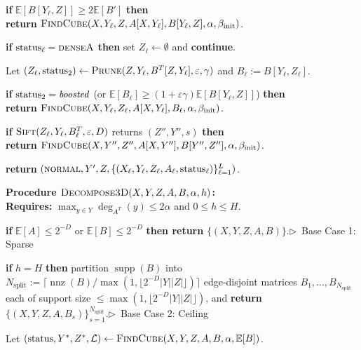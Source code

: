 \documentclass[11pt]{article}
\theoremstyle{definition}
\newcommand{\algcomment}[1]{\hfill $\triangleright$~{\small #1}}
\renewcommand{\label}[1]{}%
\newcommand{\E}{\mathbb{E}}
\newcommand{\supp}{\operatorname{supp}}
\newcommand{\nnz}{\operatorname{nnz}}
\newcommand{\abs}[1]{\left\lvert #1 \right\rvert}
\newcommand{\dens}[1]{\E[#1]}
\newcommand{\Prune}{\textnormal{\textsc{Prune}}}
\newcommand{\Sift}{\textnormal{\textsc{Sift}}}
\newcommand{\FindCube}{\textnormal{\textsc{FindCube}}}
\newcommand{\DecomposeThreeD}{\textnormal{\textsc{Decompose3D}}}
\newcommand{\tagdenseA}{\textnormal{\textsc{denseA}}}
\newcommand{\tagnormal}{\textnormal{\textsc{normal}}}
\begin{document}
\begin{algorithm}[!htbp]
\begin{algsteps}
    \item \quad \textbf{if} $\dens{B[Y_\ell, Z]} \ge 2\dens{B'}$ \textbf{then}\\
    \qquad \textbf{return} $\FindCube(X, Y_\ell, Z, A[X, Y_\ell], B[Y_\ell, Z], \alpha, \beta_{\text{init}})$.\label{line:cube-slice}
    \item \quad \textbf{if} $\text{status}_\ell = \tagdenseA$ \textbf{then} set $Z_\ell \gets \emptyset$ and \textbf{continue}.\label{line:cube-densea}
    \item \quad Let $(Z_\ell, \text{status}_2) \gets \Prune(Z, Y_\ell, B^T[Z, Y_\ell], \varepsilon, \gamma)$ and $B_\ell := B[Y_\ell, Z_\ell]$.\label{line:cube-prune2}
    \item \quad \textbf{if} $\text{status}_2 = \text{\emph{boosted}}$ (or $\dens{B_\ell} \ge (1 + \varepsilon\gamma)\dens{B[Y_\ell, Z]}$) \textbf{then}\\
    \qquad \textbf{return} $\FindCube(X, Y_\ell, Z_\ell, A[X, Y_\ell], B_\ell, \alpha, \beta_{\text{init}})$.\label{line:cube-rec2}
    \item \quad \textbf{if} $\Sift(Z_\ell, Y_\ell, B_\ell^T, \varepsilon, D)$ returns $(Z'', Y'', s)$ \textbf{then}\\
    \qquad \textbf{return} $\FindCube(X, Y'', Z'', A[X, Y''], B[Y'', Z''], \alpha, \beta_{\text{init}})$.\label{line:cube-sift}
    \item \textbf{return} $(\tagnormal, Y', Z, \{(X_\ell, Y_\ell, Z_\ell, A_\ell, \text{status}_\ell)\}_{\ell=1}^L)$.\label{line:cube-ret}
\end{algsteps}
\vspace{4pt}
\textbf{Procedure $\DecomposeThreeD(X, Y, Z, A, B, \alpha, h)$:}\\
\textbf{Requires:} $\max_{y \in Y}\deg_{A^T}(y) \le 2\alpha$ and $0 \le h \le H$.
\begin{algsteps}[resume]
    \item \textbf{if} $\dens{A} \le 2^{-D}$ or $\dens{B} \le 2^{-D}$ \textbf{then return} $\{(X, Y, Z, A, B)\}$.\algcomment{Base Case 1: Sparse}\label{line:3d-base1}
    \item \textbf{if} $h = H$ \textbf{then} partition $\supp(B)$ into $N_{\text{split}} := \lceil \nnz(B)/\max(1, \lfloor 2^{-D}\abs{Y}\abs{Z} \rfloor) \rceil$ edge-disjoint matrices $B_1, \dots, B_{N_{\text{split}}}$ each of support size $\le \max(1, \lfloor 2^{-D}\abs{Y}\abs{Z} \rfloor)$, and \textbf{return} $\{(X, Y, Z, A, B_s)\}_{s=1}^{N_{\text{split}}}$.\algcomment{Base Case 2: Ceiling}\label{line:3d-base2}
    \item Let $(\text{status}, Y^*, Z^*, \mathcal{L}) \gets \FindCube(X, Y, Z, A, B, \alpha, \dens{B})$.\label{line:3d-findcube}

\end{algsteps}
\end{algorithm}
\end{document}
